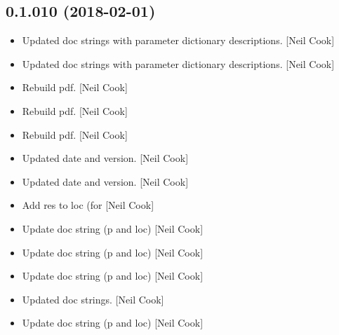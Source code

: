 \documentclass[a4paper,10pt,english]{report}
\begin{document}
\subsection{0.1.010 (2018-02-01)}
\label{\detokenize{misc/changelog:id493}}\begin{itemize}
\item {} 
Updated doc strings with parameter dictionary descriptions. {[}Neil
Cook{]}

\item {} 
Updated doc strings with parameter dictionary descriptions. {[}Neil
Cook{]}

\item {} 
Rebuild pdf. {[}Neil Cook{]}

\item {} 
Rebuild pdf. {[}Neil Cook{]}

\item {} 
Rebuild pdf. {[}Neil Cook{]}

\item {} 
Updated date and version. {[}Neil Cook{]}

\item {} 
Updated date and version. {[}Neil Cook{]}

\item {} 
Add res to loc (for  {[}Neil Cook{]}

\item {} 
Update doc string (p and loc) {[}Neil Cook{]}

\item {} 
Update doc string (p and loc) {[}Neil Cook{]}

\item {} 
Update doc string (p and loc) {[}Neil Cook{]}

\item {} 
Updated doc strings. {[}Neil Cook{]}

\item {} 
Update doc string (p and loc) {[}Neil Cook{]}

\end{itemize}
\end{document}
